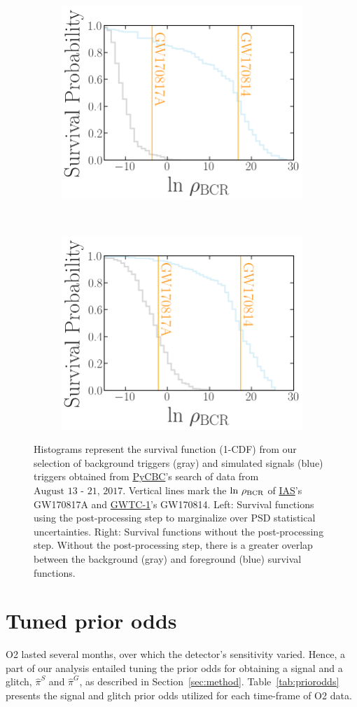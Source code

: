 \documentclass[
 nofootinbib,
 amsmath,amssymb,
 aps,
 twocolumn,
 superscriptaddress
]{revtex4-2}
\newcommand{\pycbc}{{\sc \href{https://pycbc.org/}{{PyCBC}}}\xspace}
\newcommand{\GWTC}{{\sc \href{https://ui.adsabs.harvard.edu/abs/2019PhRvX...9c1040A/abstract}{{GWTC-1}}}\xspace}
\newcommand{\IAS}{{\sc \href{https://ui.adsabs.harvard.edu/abs/2020PhRvD.101h3030V/abstract}{{IAS}}}\xspace}
\newcommand{\mathcmd}[1]{{\sc \relax\ifmmode#1\else $#1$\fi}\xspace}
\newcommand{\bcr}{\mathcmd{\rho_\text{BCR}}}
\begin{document}
\begin{figure}
    \centering
    \begin{subfigure}
        \centering
        \includegraphics[width=0.45\linewidth]{reweighted_bcr_cdf_smaller_legend.png}
    \end{subfigure}
    ~ 
    \begin{subfigure}
        \centering
        \includegraphics[width=0.45\linewidth]{orig_bcr_cdf_smaller_legend.png}
    \end{subfigure}
    \caption{
    Histograms represent the survival function (1-CDF) from our selection of background triggers (gray) and simulated signals (blue) triggers obtained from \pycbc's search of data from $\text{August 13 - 21, 2017}$. Vertical lines mark the $\text{ln}\ \bcr$ of \IAS's GW170817A and \GWTC's GW170814.
    Left: Survival functions using the post-processing step to marginalize over PSD statistical uncertainties. Right: Survival functions without the post-processing step. Without the post-processing step, there is a greater overlap between the background (gray) and foreground (blue) survival functions.
    \label{fig:bcrCdf}}
\end{figure}






\section{Tuned prior odds}\label{apdx:alphabeta}

O2 lasted several months, over which the detector's sensitivity varied. Hence, a part of our analysis entailed tuning the prior odds for obtaining a signal and a glitch, $\hat{\pi}^S$ and $\hat{\pi}^G$, as described in Section~\ref{sec:method}. Table~\ref{tab:priorodds} presents the signal and glitch prior odds utilized for each time-frame of O2 data. 

\end{document}
